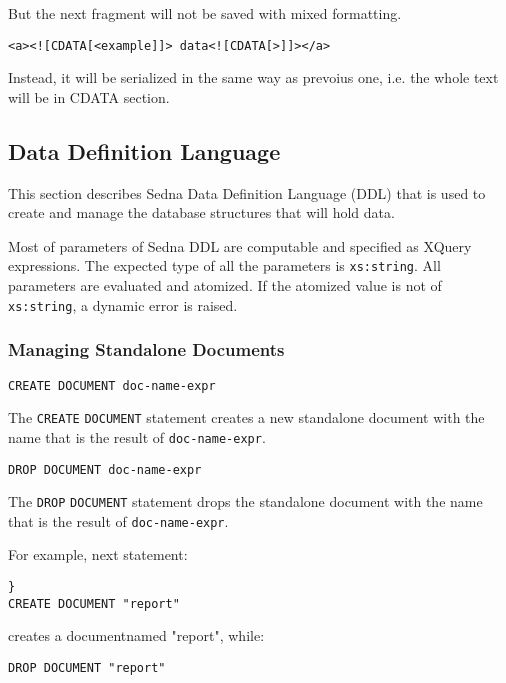 \documentclass[a4paper,12pt]{article}
\begin{document}
But the next fragment will not be saved with mixed formatting.

\begin{verbatim}
<a><![CDATA[<example]]> data<![CDATA[>]]></a>
\end{verbatim}

Instead, it will be serialized in the same way as prevoius one, i.e. the whole
text will be in CDATA section.

\subsection{Data Definition Language}

This section describes Sedna Data Definition Language (DDL) that is used to
create and manage the database structures that will hold data.

Most of parameters of Sedna DDL are computable and specified as XQuery
expressions. The expected type of all the parameters is \verb!xs:string!. All
parameters are evaluated and atomized. If the atomized value is not of
\verb!xs:string!, a dynamic error is raised.


\subsubsection{Managing Standalone Documents}
\begin{verbatim}
CREATE DOCUMENT doc-name-expr
\end{verbatim}

The \verb!CREATE! \verb!DOCUMENT! statement creates a new standalone document
with the name that is the result of \verb!doc-name-expr!.

\begin{verbatim}
DROP DOCUMENT doc-name-expr
\end{verbatim}

The \verb!DROP! \verb!DOCUMENT! statement drops the standalone document with the
name that is the result of \verb!doc-name-expr!.

For example, next statement:
\begin{verbatim}}
CREATE DOCUMENT "report"
\end{verbatim}
creates a documentnamed "report", while:
\begin{verbatim}
DROP DOCUMENT "report"
\end{verbatim}
\end{document}
